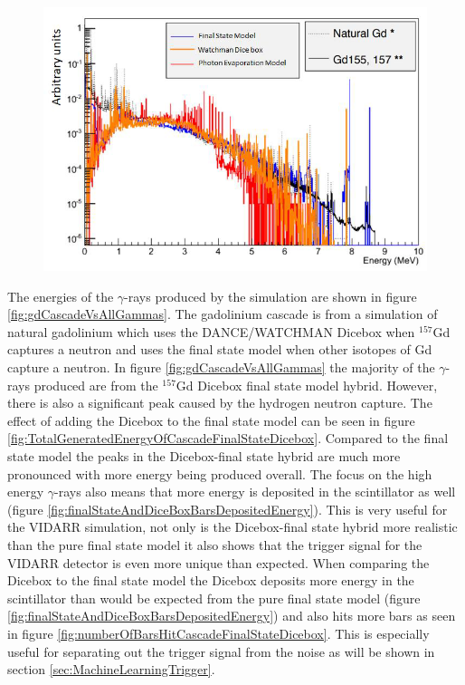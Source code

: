 \begin{figure}[!h]
 \centering
 \includegraphics[width=0.6\linewidth]{Chapter4/Figs/Raster/gadolinium/comparisonAndDiceBoxGd.png}
 \label{fig:comparisonAndDiceBoxGd}
\end{figure}

The energies of the $\gamma$-rays produced by the simulation are shown in figure \ref{fig:gdCascadeVsAllGammas}. The gadolinium cascade is from a simulation of natural gadolinium which uses the DANCE/WATCHMAN Dicebox when $^{157}$Gd captures a neutron and uses the final state model when other isotopes of Gd capture a neutron. In figure \ref{fig:gdCascadeVsAllGammas} the majority of the $\gamma$-rays produced are from the $^{157}$Gd Dicebox final state model hybrid. However, there is also a significant peak caused by the hydrogen neutron capture. The effect of adding the Dicebox to the final state model can be seen in figure \ref{fig:TotalGeneratedEnergyOfCascadeFinalStateDicebox}. Compared to the final state model the peaks in the Dicebox-final state hybrid are much more pronounced with more energy being produced overall. The focus on the high energy $\gamma$-rays also means that more energy is deposited in the scintillator as well (figure \ref{fig:finalStateAndDiceBoxBarsDepositedEnergy}). This is very useful for the VIDARR simulation, not only is the Dicebox-final state hybrid more realistic than the pure final state model it also shows that the trigger signal for the VIDARR detector is even more unique than expected. When comparing the Dicebox to the final state model the Dicebox deposits more energy in the scintillator than would be expected from the pure final state model (figure \ref{fig:finalStateAndDiceBoxBarsDepositedEnergy}) and also hits more bars as seen in figure \ref{fig:numberOfBarsHitCascadeFinalStateDicebox}. This is especially useful for separating out the trigger signal from the noise as will be shown in section \ref{sec:MachineLearningTrigger}.

